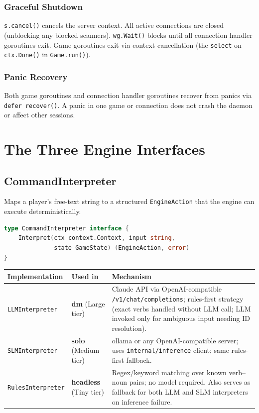 \documentclass[a4paper,10pt]{article}
\newcommand{\mode}[1]{\textbf{#1}}
\newcommand{\pkg}[1]{\texttt{#1}}
\begin{document}
\subsubsection{Graceful Shutdown}

\texttt{s.cancel()} cancels the server context.  All active
connections are closed (unblocking any blocked scanners).
\texttt{wg.Wait()} blocks until all connection handler goroutines
exit.  Game goroutines exit via context cancellation (the
\texttt{select} on \texttt{ctx.Done()} in \texttt{Game.run()}).

\subsubsection{Panic Recovery}

Both game goroutines and connection handler goroutines recover from
panics via \texttt{defer recover()}.  A panic in one game or
connection does not crash the daemon or affect other sessions.

\section{The Three Engine Interfaces}
\label{sec:interfaces}

\subsection{CommandInterpreter}

Maps a player's free-text string to a structured
\texttt{EngineAction} that the engine can execute deterministically.

\begin{lstlisting}[language=Go]
type CommandInterpreter interface {
    Interpret(ctx context.Context, input string,
              state GameState) (EngineAction, error)
}
\end{lstlisting}

\begin{center}
\small
\begin{tabular}{lp{2.5cm}p{7cm}}
\toprule
\textbf{Implementation} & \textbf{Used in} & \textbf{Mechanism} \\
\midrule
\texttt{LLMInterpreter}
  & \mode{dm} (Large tier)
  & Claude API via OpenAI-compatible \texttt{/v1/\allowbreak chat/\allowbreak completions};
    rules-first strategy (exact verbs handled without LLM call;
    LLM invoked only for ambiguous input needing ID resolution). \\
\texttt{SLMInterpreter}
  & \mode{solo} (Medium tier)
  & ollama or any OpenAI-compatible server; uses
    \pkg{internal/\allowbreak inference} client; same rules-first fallback. \\
\texttt{Rules\-Interpreter}
  & \mode{headless} (Tiny tier)
  & Regex/keyword matching over known verb--noun pairs; no model
    required.  Also serves as fallback for both LLM and SLM
    interpreters on inference failure. \\
\bottomrule
\end{tabular}
\end{center}
\end{document}
